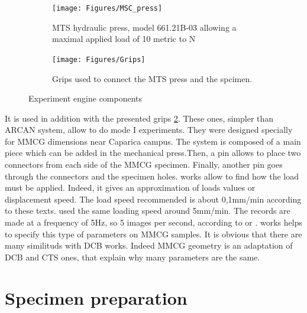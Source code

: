 \begin{figure}[th]
	\centering
	\begin{subfigure}{0.48\linewidth}
		\texttt{[image: Figures/MSC\_press]}
		\decoRule
		\caption[MTS hydraulic press]{MTS hydraulic press, model 661.21B-03 allowing a maximal applied load of 10 metric to N}
		\label{fig:Fig8_a}
	\end{subfigure}
	\hfill
	\begin{subfigure}{0.48\linewidth}
		\texttt{[image: Figures/Grips]}
		\decoRule
		\caption[Grips]{Grips used to connect the MTS press and the spcimen.}
		\label{fig:Fig8_b}
	\end{subfigure}
	\caption{Experiment engine components}
	\label{fig:Fig8}
\end{figure}
It is used in addition with the presented grips \ref{fig:Fig8_b}. These ones, simpler than ARCAN system, allow to do mode I experiments. They were designed specially for MMCG dimensions near Caparica campus. The system is composed of a main piece which can be added in the mechanical press.Then, a pin allows to place two connectors from each side of the MMCG specimen. Finally, another pin goes through the connectors and the specimen holes.
\parencite{Reference17} works allow to find how the load must be applied. Indeed, it gives an approximation of loads values or displacement speed. The load speed recommended is about 0,1mm/min according to these texts. \parencite{Reference7} used the same loading speed around 5mm/min. The records are made at a frequency of 5Hz, so 5 images per second, according to \parencite{Reference17} or \parencite{Reference16}.
\parencite{Reference7} works helps to specify this type of parameters on MMCG samples. It is obvious that there are many similituds with DCB works. Indeed MMCG geometry is an adaptation of DCB and CTS ones, that explain why many parameters are the same.

\section{Specimen preparation}


